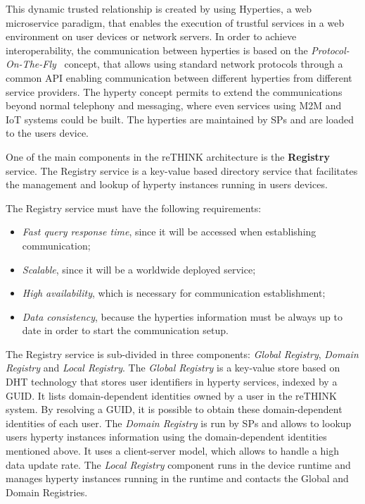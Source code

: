 This dynamic trusted relationship is created by using \ac{Hyperties}, a web microservice paradigm, that enables the execution of trustful services in a web environment on user devices or network servers.
In order to achieve interoperability, the communication between hyperties is based on the \textit{Protocol-On-The-Fly}~\cite{protofly} concept, that allows using standard network protocols through a common API enabling communication between different hyperties from different service providers.
The hyperty concept permits to extend the communications beyond normal telephony and messaging, where even services using \ac{M2M} and \ac{IoT} systems could be built.
The hyperties are maintained by \acp{SP} and are loaded to the users device.

One of the main components in the reTHINK architecture is the \textbf{Registry} service.
The Registry service is a key-value based directory service that facilitates the management and lookup of hyperty instances running in users devices.

The Registry service must have the following requirements:
\begin{itemize}
  \item \textit{Fast query response time}, since it will be accessed when establishing communication;
	\item \textit{Scalable}, since it will be a worldwide deployed service;
  \item \textit{High availability}, which is necessary for communication establishment;
  \item \textit{Data consistency}, because the hyperties information must be always up to date in order to start the communication setup.
\end{itemize}

The Registry service is sub-divided in three components: \textit{Global Registry}, \textit{Domain Registry} and \textit{Local Registry}.
The \textit{Global Registry} is a key-value store based on \ac{DHT} technology that stores user identifiers in hyperty services, indexed by a \ac{GUID}.
It lists domain-dependent identities owned by a user in the reTHINK system.
By resolving a \ac{GUID}, it is possible to obtain these domain-dependent identities of each user.
The \textit{Domain Registry} is run by \acp{SP} and allows to lookup users hyperty instances information using the domain-dependent identities mentioned above.
It uses a client-server model, which allows to handle a high data update rate.
The \textit{Local Registry} component runs in the device runtime and manages hyperty instances running in the runtime and contacts the Global and Domain Registries.


